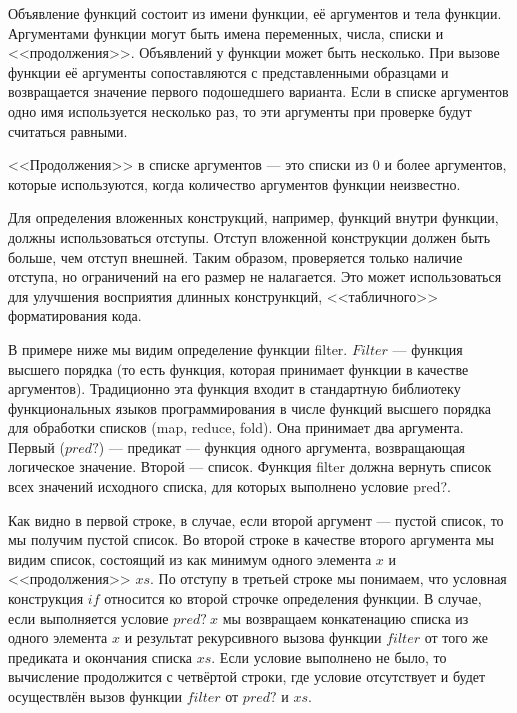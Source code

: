         Объявление функций состоит из имени функции, её аргументов и тела функции.
        Аргументами функции могут быть имена переменных, числа, списки и <<продолжения>>.
        Объявлений у функции может быть несколько.
        При вызове функции её аргументы сопоставляются с представленными образцами и возвращается значение первого подошедшего варианта.
        Если в списке аргументов одно имя используется несколько раз, то эти аргументы при проверке будут считаться равными.

        <<Продолжения>> в списке аргументов --- это списки из 0 и более аргументов, которые используются, когда количество аргументов функции неизвестно.

        Для определения вложенных конструкций, например, функций внутри функции, должны использоваться отступы.
        Отступ вложенной конструкции должен быть больше, чем отступ внешней.
        Таким образом, проверяется только наличие отступа, но ограничений на его размер не налагается.
        Это может использоваться для улучшения восприятия длинных констрункций, <<табличного>> форматирования кода.

        В примере ниже мы видим определение функции filter.
        $Filter$ --- функция высшего порядка (то есть функция, которая принимает функции в качестве аргументов).
        Традиционно эта функция входит в стандартную библиотеку функциональных языков программирования в числе функций высшего порядка для обработки списков (map, reduce, fold).
        Она принимает два аргумента.
        Первый ($pred?$) --- предикат --- функция одного аргумента, возвращающая логическое значение.
        Второй --- список.
        Функция filter должна вернуть список всех значений исходного списка, для которых выполнено условие pred?.

        Как видно в первой строке, в случае, если второй аргумент --- пустой список, то мы получим пустой список.
        Во второй строке в качестве второго аргумента мы видим список, состоящий из как минимум одного элемента $x$ и <<продолжения>> $xs$.
        По отступу в третьей строке мы понимаем, что условная конструкция $if$ относится ко второй строчке определения функции.
        В случае, если выполняется условие $pred?~x$ мы возвращаем конкатенацию списка из одного элемента $x$ и результат рекурсивного вызова функции $filter$ от того же предиката и окончания списка $xs$.
        Если условие выполнено не было, то вычисление продолжится с четвёртой строки, где условие отсутствует и будет осуществлён вызов функции $filter$ от $pred?$ и $xs$.

